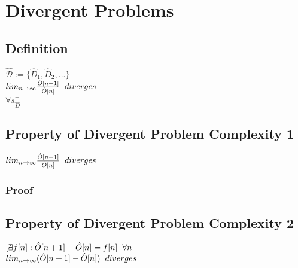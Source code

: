 \documentclass[11pt]{article}
\begin{document}
\section{Divergent Problems}
\subsection{Definition}
\begin{center}
$
\mathcal{\hat{D}} := \{ \hat{D}_1,\hat{D}_2,...\} 
$
\\ \vspace{2mm}
$
lim_{n \rightarrow \infty} \frac{\hat{O}[n+1]}{\hat{O}[n]} \hspace{2mm} diverges
$
\\ \vspace{2mm}
$
\forall s^+_{\hat{D}}
$
\end{center}

\subsection{Property of Divergent Problem Complexity 1}
\begin{center}
$
lim_{n \rightarrow \infty} \frac{\hat{O}[n+1]}{\hat{O}[n]} \hspace{2mm} diverges
$
\end{center}
\subsubsection{Proof}


\subsection{Property of Divergent Problem Complexity 2}
\begin{center}
$
\not \exists f[n] :  \hat{O}[n+1] - \hat{O}[n] = f[n] \hspace{2mm} \forall n
$
\\ \vspace{2mm}
$
lim_{n \rightarrow \infty}( \hat{O}[n+1] - \hat{O}[n] ) \hspace{2mm} diverges
$
\end{center}
\end{document}
